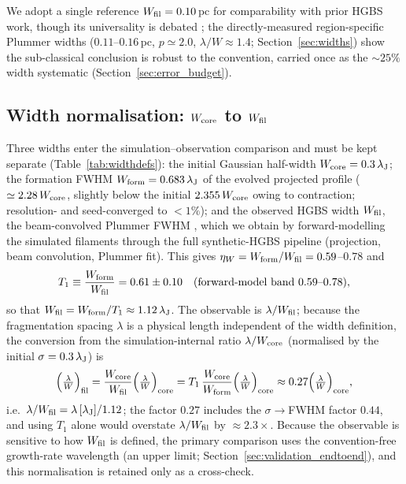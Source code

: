 \documentclass[usenatbib,twoside,twocolumn]{mnras}
\begin{document}
We adopt a single reference $W_{\rm fil}=0.10$\,pc for comparability with prior HGBS work, though its universality is debated \citep{Panopoulou2017,Panopoulou2022}; the directly-measured region-specific Plummer widths ($0.11$--$0.16$\,pc, $p\simeq2.0$, $\lambda/W\approx1.4$; Section~\ref{sec:widths}) show the sub-classical conclusion is robust to the convention, carried once as the $\sim25\%$ width systematic (Section~\ref{sec:error_budget}).

\subsection{Width normalisation: $W_{\rm core}$ to $W_{\rm fil}$}
\label{sec:width_correction}
Three widths enter the simulation--observation comparison and must be kept separate (Table~\ref{tab:widthdefs}): the initial Gaussian half-width $W_{\rm core}=0.3\,\lambda_{\rm J}$; the formation FWHM $W_{\rm form}=0.683\,\lambda_{\rm J}$ of the evolved projected profile ($\simeq2.28\,W_{\rm core}$, slightly below the initial $2.355\,W_{\rm core}$ owing to contraction; resolution- and seed-converged to $<1\%$); and the observed HGBS width $W_{\rm fil}$, the beam-convolved Plummer FWHM \citep{Arzoumanian2019}, which we obtain by forward-modelling the simulated filaments through the full synthetic-HGBS pipeline (projection, beam convolution, Plummer fit). This gives $\eta_W=W_{\rm form}/W_{\rm fil}=0.59$--$0.78$ and
\begin{equation}
T_1 \equiv \frac{W_{\rm form}}{W_{\rm fil}} = 0.61 \pm 0.10 \quad (\text{forward-model band } 0.59\text{--}0.78),
\label{eq:t1_correction}
\end{equation}
so that $W_{\rm fil}=W_{\rm form}/T_1\approx1.12\,\lambda_{\rm J}$. The observable is $\lambda/W_{\rm fil}$; because the fragmentation spacing $\lambda$ is a physical length independent of the width definition, the conversion from the simulation-internal ratio $\lambda/W_{\rm core}$ (normalised by the initial $\sigma=0.3\,\lambda_{\rm J}$) is
\begin{equation}
\Big(\tfrac{\lambda}{W}\Big)_{\rm fil} = \frac{W_{\rm core}}{W_{\rm fil}}\Big(\tfrac{\lambda}{W}\Big)_{\rm core} = T_1\,\frac{W_{\rm core}}{W_{\rm form}}\Big(\tfrac{\lambda}{W}\Big)_{\rm core} \approx 0.27\Big(\tfrac{\lambda}{W}\Big)_{\rm core},
\label{eq:t1_apply}
\end{equation}
i.e.\ $\lambda/W_{\rm fil}=\lambda\,[\lambda_{\rm J}]/1.12$; the factor $0.27$ includes the $\sigma\!\to\!$FWHM factor $0.44$, and using $T_1$ alone would overstate $\lambda/W_{\rm fil}$ by $\approx2.3\times$. Because the observable is sensitive to how $W_{\rm fil}$ is defined, the primary comparison uses the convention-free growth-rate wavelength (an upper limit; Section~\ref{sec:validation_endtoend}), and this normalisation is retained only as a cross-check.
\end{document}
